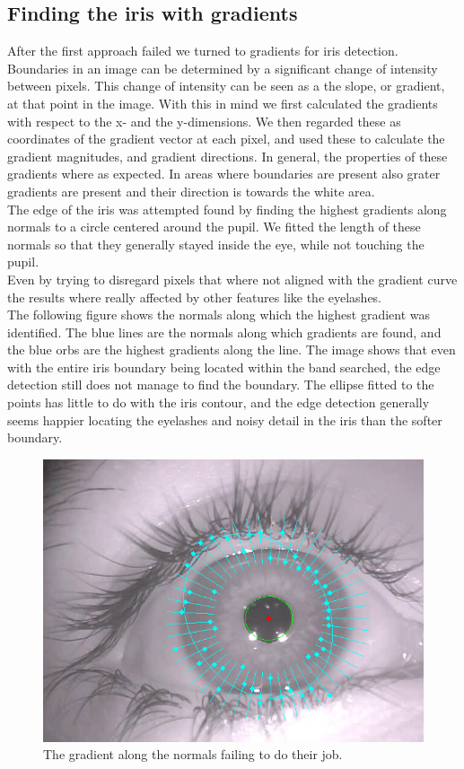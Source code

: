 \subsection{Finding the iris with gradients} 
After the first approach failed we turned to gradients for iris detection. Boundaries in an image can be determined by a significant change of intensity between pixels. This change of intensity can be seen as a the slope, or gradient, at that point in the image. With this in mind we first calculated the gradients with respect to the x- and the y-dimensions. We then regarded these as coordinates of the gradient vector at each pixel, and used these to calculate the gradient magnitudes, and gradient directions. In general, the properties of these gradients where as expected. In areas where boundaries are present also grater gradients are present and their direction is towards the white area. \\
The edge of the iris was attempted found by finding the highest gradients along normals to a circle centered around the pupil. We fitted the length of these normals so that they generally stayed inside the eye, while not touching the pupil.\\
Even by trying to disregard pixels that where not aligned with the gradient curve the results where really affected by other features like the eyelashes.\\
The following figure shows the normals along which the highest gradient was identified. The blue lines are the normals along which gradients are found, and the blue orbs are the highest gradients along the line. The image shows that even with the entire iris boundary being located within the band searched, the edge detection still does not manage to find the boundary. The ellipse fitted to the points has little to do with the iris contour, and the edge detection generally seems happier locating the eyelashes and noisy detail in the iris than the softer boundary.
\begin{figure}[h]
	\centering
	\includegraphics[scale=0.3]{iris_band_failure.png}
	\caption{The gradient along the normals failing to do their job.}
\end{figure}